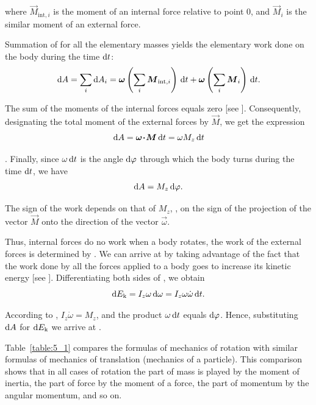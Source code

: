 \noindent
where $\vec{M}_{\text{int},i}$ is the moment of an internal force relative to point $0$, and $\vec{M}_i$ is the similar moment of an external force.

Summation of  for all the elementary masses yields the elementary work done on the body during the time $\mathrm{d} t$:
\begin{equation*}
	\mathrm{d} A = \sum_i \mathrm{d} A_i = \boldsymbol{\omega}\left(\sum_i \boldsymbol{M}_{\text{int},i}\right)\,\mathrm{d} t + \boldsymbol{\omega}\left(\sum_i \boldsymbol{M}_{i}\right)\,\mathrm{d} t.
\end{equation*}

\noindent
The sum of the moments of the internal forces equals zero [see ]. Consequently, designating the total moment of the external forces by $\vec{M}$, we get the expression
\begin{equation}\label{eq:5_48}
	\mathrm{d} A = \boldsymbol{\omega\!\cdot\!M}\,\mathrm{d} t = \omega M_z\,\mathrm{d} t
\end{equation}

\noindent
[we have used \eqn{1_21}, taking into account that $M_{\omega} = M_z$]. Finally, since $\omega\,\mathrm{d} t$ is the angle $\mathrm{d}\varphi$ through which the body turns during the time $\mathrm{d} t$, we have
\begin{equation}\label{eq:5_49}
	\mathrm{d} A = M_z\,\mathrm{d}\varphi.
\end{equation}

\noindent
The sign of the work depends on that of $M_z$, \ie, on the sign of the projection of the vector $\vec{M}$ onto the direction of the vector $\vec{\omega}$.

Thus, internal forces do no work when a body rotates, the work of the external forces is determined by . We can arrive at  by taking advantage of the fact that the work done by all the forces applied to a body goes to increase its kinetic energy [see ]. Differentiating both sides of , we obtain
\begin{equation*}
	\mathrm{d} E_{\text{k}} = I_z\omega\,\mathrm{d}\omega = I_z\omega\dot{\omega}\,\mathrm{d} t.
\end{equation*}

\noindent
According to , $I_z\dot{\omega}=M_z$, and the product $\omega\,\mathrm{d} t$ equals $\mathrm{d}\varphi$. Hence, substituting $\mathrm{d} A$ for $\mathrm{d} E_{\text{k}}$ we arrive at .

Table~\ref{table:5_1} compares the formulas of mechanics of rotation with similar formulas of mechanics of translation (mechanics of a particle). This comparison shows that in all cases of rotation the part of mass is played by the moment of inertia, the part of force by the moment of a force, the part of momentum by the angular momentum, and so on.

